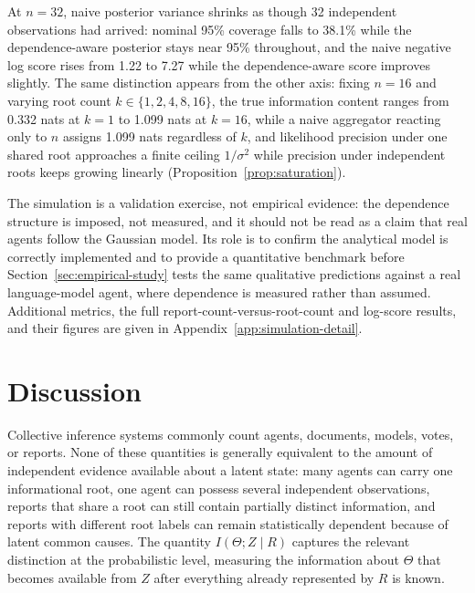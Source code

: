 \documentclass[11pt]{article}
\theoremstyle{definition}
\begin{document}
At $n=32$, naive posterior variance shrinks as though 32 independent observations had arrived: nominal 95\% coverage falls to 38.1\% while the dependence-aware posterior stays near 95\% throughout, and the naive negative log score rises from 1.22 to 7.27 while the dependence-aware score improves slightly. \label{sec:sim-rootcount}The same distinction appears from the other axis: fixing $n=16$ and varying root count $k\in\{1,2,4,8,16\}$, the true information content ranges from 0.332 nats at $k=1$ to 1.099 nats at $k=16$, while a naive aggregator reacting only to $n$ assigns 1.099 nats regardless of $k$, and likelihood precision under one shared root approaches a finite ceiling $1/\sigma^2$ while precision under independent roots keeps growing linearly (Proposition~\ref{prop:saturation}).

The simulation is a validation exercise, not empirical evidence: the dependence structure is imposed, not measured, and it should not be read as a claim that real agents follow the Gaussian model. Its role is to confirm the analytical model is correctly implemented and to provide a quantitative benchmark before Section~\ref{sec:empirical-study} tests the same qualitative predictions against a real language-model agent, where dependence is measured rather than assumed. Additional metrics, the full report-count-versus-root-count and log-score results, and their figures are given in Appendix~\ref{app:simulation-detail}.



\section{Discussion}
\label{sec:discussion}

Collective inference systems commonly count agents, documents, models, votes, or reports. None of these quantities is generally equivalent to the amount of independent evidence available about a latent state: many agents can carry one informational root, one agent can possess several independent observations, reports that share a root can still contain partially distinct information, and reports with different root labels can remain statistically dependent because of latent common causes. The quantity $I(\Theta;Z\mid R)$ captures the relevant distinction at the probabilistic level, measuring the information about $\Theta$ that becomes available from $Z$ after everything already represented by $R$ is known.
\end{document}
